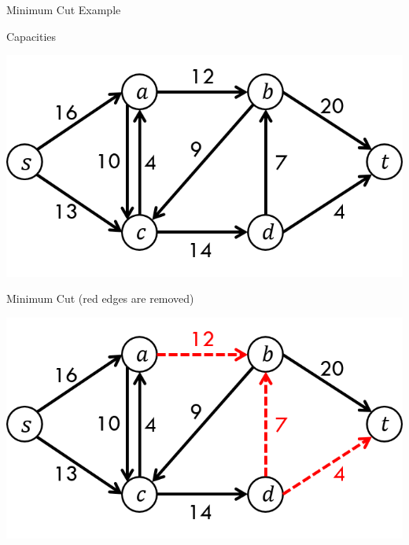 \documentclass[13pt,onlymath]{beamer}
\begin{document}
\begin{frame}{Minimum Cut Example}
\BIT
\item Capacities
\begin{center}
\includegraphics[height=0.3\textheight]{figures/flow_example1}
\end{center}
\vfill
\item Minimum Cut (red edges are removed)
\begin{center}
\includegraphics[height=0.3\textheight]{figures/mincut_example}
\end{center}
\EIT
\end{frame}
\end{document}

